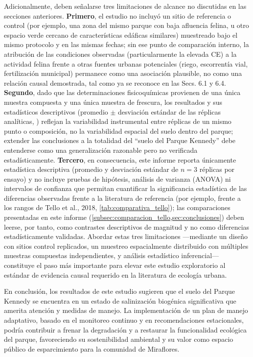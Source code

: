 \documentclass[fleqn]{jaes}
\begin{document}
Adicionalmente, deben señalarse tres limitaciones de alcance no discutidas en las secciones anteriores. \textbf{Primero}, el estudio no incluyó un sitio de referencia o control (por ejemplo, una zona del mismo parque con baja afluencia felina, u otro espacio verde cercano de características edáficas similares) muestreado bajo el mismo protocolo y en las mismas fechas; sin ese punto de comparación interno, la atribución de las condiciones observadas (particularmente la elevada CE) a la actividad felina frente a otras fuentes urbanas potenciales (riego, escorrentía vial, fertilización municipal) permanece como una asociación plausible, no como una relación causal demostrada, tal como ya se reconoce en las Secs. 6.1 y 6.4. \textbf{Segundo}, dado que las determinaciones fisicoquímicas provienen de una única muestra compuesta y una única muestra de frescura, los resultados y sus estadísticos descriptivos (promedio $\pm$ desviación estándar de las réplicas analíticas, ) reflejan la variabilidad instrumental entre réplicas de un mismo punto o composición, no la variabilidad espacial del suelo dentro del parque; extender las conclusiones a la totalidad del ``suelo del Parque Kennedy'' debe entenderse como una generalización razonable pero no verificada estadísticamente. \textbf{Tercero}, en consecuencia, este informe reporta únicamente estadística descriptiva (promedio y desviación estándar de $n=3$ réplicas por ensayo) y no incluye pruebas de hipótesis, análisis de varianza (ANOVA) ni intervalos de confianza que permitan cuantificar la significancia estadística de las diferencias observadas frente a la literatura de referencia (por ejemplo, frente a los rangos de Tello et al., 2018, \cref{tab:comparativa_tello}); las comparaciones presentadas en este informe (\cref{subsec:comparacion_tello,sec:conclusiones}) deben leerse, por tanto, como contrastes descriptivos de magnitud y no como diferencias estadísticamente validadas. Abordar estas tres limitaciones —mediante un diseño con sitios control replicados, un muestreo espacialmente distribuido con múltiples muestras compuestas independientes, y análisis estadístico inferencial— constituye el paso más importante para elevar este estudio exploratorio al estándar de evidencia causal requerido en la literatura de ecología urbana.

En conclusión, los resultados de este estudio sugieren que el suelo del Parque Kennedy se encuentra en un estado de salinización biogénica significativa que amerita atención y medidas de manejo. La implementación de un plan de manejo adaptativo, basado en el monitoreo continuo y en recomendaciones estacionales, podría contribuir a frenar la degradación y a restaurar la funcionalidad ecológica del parque, favoreciendo su sostenibilidad ambiental y su valor como espacio público de esparcimiento para la comunidad de Miraflores.
\end{document}
